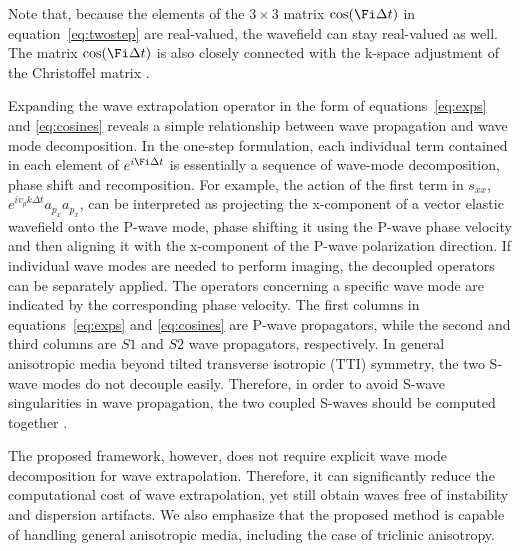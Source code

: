 Note that, because the elements of the $3\times3$ matrix $\cos(\Fi \Delta t)$ in equation~\ref{eq:twostep} are real-valued, the wavefield can stay real-valued as well. The matrix $\cos(\Fi \Delta t)$ is also closely connected with the k-space adjustment of the Christoffel matrix \cite[]{liu95,firouzi12,cheng16}. 

Expanding the wave extrapolation operator in the form of equations~\ref{eq:exps} and \ref{eq:cosines} reveals a simple relationship between wave propagation and wave mode decomposition. In the one-step formulation, each individual term contained in each element of $e^{i\Fi \Delta t}$ is essentially a sequence of wave-mode decomposition, phase shift and recomposition. For example, the action of the first term in $s_{xx}$, $e^{i v_p k \Delta t} a_{p_x} a_{p_x}$, can be interpreted as projecting the x-component of a vector elastic wavefield onto the P-wave mode, phase shifting it using the P-wave phase velocity and then aligning it with the x-component of the P-wave polarization direction. If individual wave modes are needed to perform imaging, the decoupled operators can be separately applied. The operators concerning a specific wave mode are indicated by the corresponding phase velocity. The first columns in equations~\ref{eq:exps} and \ref{eq:cosines} are P-wave propagators, while the second and third columns are $S1$ and $S2$ wave propagators, respectively. In general anisotropic media beyond tilted transverse isotropic (TTI) symmetry, the two S-wave modes do not decouple easily. Therefore, in order to avoid S-wave singularities in wave propagation, the two coupled S-waves should be computed together \cite[]{sun16,cheng16}.

The proposed framework, however, does not require explicit wave mode decomposition for wave extrapolation. Therefore, it can significantly reduce the computational cost of wave extrapolation, yet still obtain waves free of instability and dispersion artifacts. We also emphasize that the proposed method is capable of handling general anisotropic media, including the case of triclinic anisotropy.

